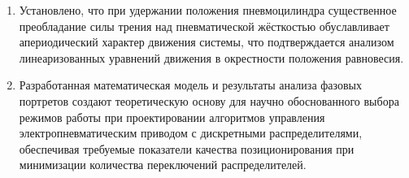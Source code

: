 \begin{enumerate}
    \item Установлено, что при удержании положения пневмоцилиндра
    существенное преобладание силы трения над пневматической жёсткостью
    обуславливает апериодический характер движения системы, что подтверждается
    анализом линеаризованных уравнений движения в окрестности положения равновесия.

    \item Разработанная математическая модель и результаты анализа
    фазовых портретов создают теоретическую основу для научно обоснованного
    выбора режимов работы при проектировании алгоритмов управления
    электропневматическим приводом с дискретными распределителями, обеспечивая требуемые
    показатели качества позиционирования при минимизации количества переключений распределителей.
\end{enumerate}
